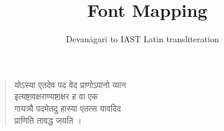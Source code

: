 \documentclass[a4paper,oneside,12pt]{article}
\title{\XeTeX\ Font Mapping}
\author{Devanāgarī to IAST Latin transliteration}
\date{\relax}
\newcommand{\sa}[1]{\textsanskrit{\sanskritfont#1}}
\begin{document}
\maketitle
\thispagestyle{empty}
\bigskip

\begin{verse}
  \sa{योऽस्या एतदेव पद वेद प्राणोऽपानो व्यान\\
    इत्यष्टावक्षराण्यष्टाक्षर ह वा एक\\
    गायत्र्यै पदमेतदु हास्या एतत्स यावदिद\\
    प्राणिति तावद्ध जयति ।
  }
\end{verse}
\end{document}
